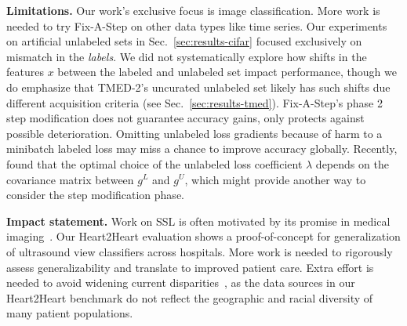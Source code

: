 \textbf{Limitations.}
Our work's exclusive focus is image classification.
More work is needed to try Fix-A-Step on other data types like time series.
Our experiments on artificial unlabeled sets in Sec.~\ref{sec:results-cifar} focused exclusively on mismatch in the \emph{labels}. We did not systematically explore how shifts in the features $x$ between the labeled and unlabeled set impact performance, though we do emphasize that TMED-2's uncurated unlabeled set likely has such shifts due different acquisition criteria (see Sec.~\ref{sec:results-tmed}).
Fix-A-Step's phase 2 step modification does not guarantee accuracy gains, only protects against possible deterioration.
Omitting unlabeled loss gradients because of harm to a minibatch labeled loss may miss a chance to improve accuracy globally. Recently, \citet{schmutz2022don} found that the optimal choice of the unlabeled loss coefficient $\lambda$ depends on the covariance matrix between $g^L$ and $g^U$, which might provide another way to consider the step modification phase.

\textbf{Impact statement.}
Work on SSL is often  motivated by its promise  in medical imaging~\citep{huangNewSemisupervisedLearning2021,madaniDeepEchocardiographyDataefficient2018}.
Our Heart2Heart evaluation shows a proof-of-concept for generalization of ultrasound view classifiers across hospitals.
More work is needed to rigorously assess generalizability and translate to improved patient care.
Extra effort is needed to avoid widening current disparities~\citep{celiSourcesBiasArtificial2022}, as the data sources in our Heart2Heart benchmark do not reflect the geographic and racial diversity of many patient populations.

